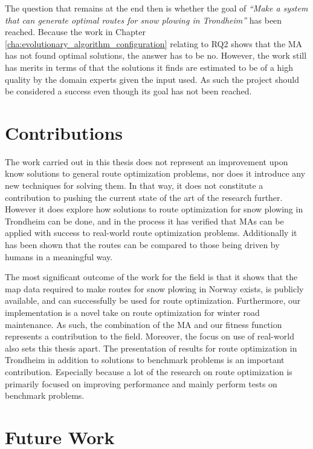 The question that remains at the end then is whether the goal of \emph{\enquote{Make a system that can generate optimal routes for snow plowing in Trondheim}} has been reached. Because the work in Chapter \ref{cha:evolutionary_algorithm_configuration} relating to RQ2 shows that the MA has not found optimal solutions, the answer has to be no. However, the work still has merits in terms of that the solutions it finds are estimated to be of a high quality by the domain experts given the input used. As such the project should be considered a success even though its goal has not been reached.


\section{Contributions}

The work carried out in this thesis does not represent an improvement upon know solutions to general route optimization problems, nor does it introduce any new techniques for solving them. In that way, it does not constitute a contribution to pushing the current state of the art of the research further. However it does explore how solutions to route optimization for snow plowing in Trondheim can be done, and in the process it has verified that MAs can be applied with success to real-world route optimization problems. Additionally it has been shown that the routes can be compared to those being driven by humans in a meaningful way.

The most significant outcome of the work for the field is that it shows that the map data required to make routes for snow plowing in Norway exists, is publicly available, and can successfully be used for route optimization. Furthermore, our implementation is a novel take on route optimization for winter road maintenance. As such, the combination of the MA and our fitness function represents a contribution to the field. Moreover, the focus on use of real-world also sets this thesis apart. The presentation of results for route optimization in Trondheim in addition to solutions to benchmark problems is an important contribution. Especially because a lot of the research on route optimization is primarily focused on improving performance and mainly perform tests on benchmark problems.

\section{Future Work}

